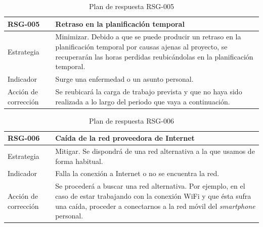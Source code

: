 \begin{table}[htpb]
\centering
\begin{tabularx}{\textwidth}{|l|X|}
\hline
\rowcolor[gray]{0.9}\textbf{RSG-005}              & \textbf{Retraso en la planificación temporal}                                                                                                                                                     \\ \hline
Estrategia & Minimizar. Debido a que se puede producir un retraso en la planificación temporal por causas ajenas al proyecto, se recuperarán las horas perdidas reubicándolas en la planificación temporal. \\ \hline
Indicador            & Surge una enfermedad o un asunto personal.                                                                                                                                               \\ \hline
Acción de corrección & Se reubicará la carga de trabajo prevista y que no haya sido realizada a lo largo del periodo que vaya a continuación.                                                                   \\ \hline
\end{tabularx}
\caption{Plan de respuesta RSG-005}
\end{table}


\begin{table}[htpb]
\centering
\begin{tabularx}{\textwidth}{|l|X|}
\hline
\rowcolor[gray]{0.9}\textbf{RSG-006}              & \textbf{Caída de la red proveedora de Internet}                                                                                                                                                                 \\ \hline
Estrategia & Mitigar. Se dispondrá de una red alternativa a la que usamos de forma habitual.                                                                                                                        \\ \hline
Indicador            & Falla la conexión a Internet o no se encuentra la red.                                                                                                                                                 \\ \hline
Acción de corrección & Se procederá a buscar una red alternativa. Por ejemplo, en el caso de estar trabajando con la conexión WiFi y que ésta sufra una caída, proceder a conectarnos a la red móvil del \textit{smartphone} personal. \\ \hline
\end{tabularx}
\caption{Plan de respuesta RSG-006}
\end{table}


